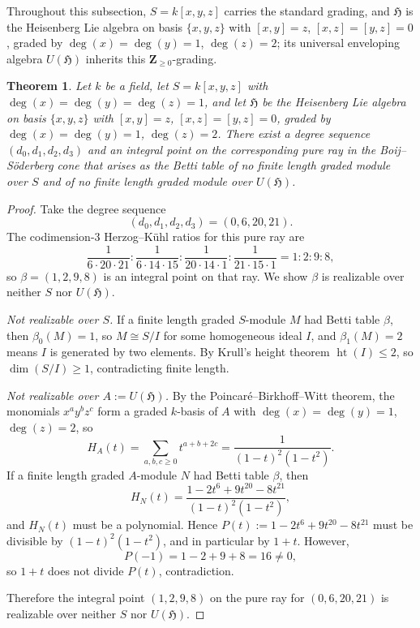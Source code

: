 \documentclass[11pt,reqno]{amsart}
\numberwithin{equation}{section}
\newtheorem{theorem}[thm]{Theorem}
\theoremstyle{definition}
\begin{document}
Throughout this subsection, $S=k[x,y,z]$ carries the standard grading,
and $\mathfrak H$ is the Heisenberg Lie algebra on basis $\{x,y,z\}$
with $[x,y]=z$, $[x,z]=[y,z]=0$, graded by $\deg(x)=\deg(y)=1$,
$\deg(z)=2$; its universal enveloping algebra $U(\mathfrak H)$
inherits this $\mathbf Z_{\ge 0}$-grading.

\begin{theorem}\label{thm:bs61}
Let $k$ be a field, let $S=k[x,y,z]$ with $\deg(x)=\deg(y)=\deg(z)=1$,
and let $\mathfrak H$ be the Heisenberg Lie algebra on basis $\{x,y,z\}$
with $[x,y]=z$, $[x,z]=[y,z]=0$, graded by $\deg(x)=\deg(y)=1$,
$\deg(z)=2$. There exist a degree sequence $(d_0,d_1,d_2,d_3)$ and an
integral point on the corresponding pure ray in the Boij--S\"oderberg
cone that arises as the Betti table of no finite length graded module
over $S$ and of no finite length graded module over $U(\mathfrak H)$.
\end{theorem}

\begin{proof}
Take the degree sequence
\[
   (d_0,d_1,d_2,d_3)=(0,6,20,21).
\]
The codimension-$3$ Herzog--K\"uhl ratios for this pure ray are
\[
   \frac{1}{6\cdot 20\cdot 21}:\frac{1}{6\cdot 14\cdot 15}
   :\frac{1}{20\cdot 14\cdot 1}:\frac{1}{21\cdot 15\cdot 1}
   =1:2:9:8,
\]
so $\beta=(1,2,9,8)$ is an integral point on that ray. We show $\beta$ is
realizable over neither $S$ nor $U(\mathfrak H)$.

\smallskip
\noindent\emph{Not realizable over $S$.} If a finite length graded
$S$-module $M$ had Betti table $\beta$, then $\beta_0(M)=1$, so
$M\cong S/I$ for some homogeneous ideal $I$, and $\beta_1(M)=2$ means
$I$ is generated by two elements. By Krull's height theorem
$\operatorname{ht}(I)\le 2$, so $\dim(S/I)\ge 1$, contradicting finite
length.

\smallskip
\noindent\emph{Not realizable over $A:=U(\mathfrak H)$.} By the
Poincar\'e--Birkhoff--Witt theorem, the monomials $x^a y^b z^c$ form a
graded $k$-basis of $A$ with $\deg(x)=\deg(y)=1$, $\deg(z)=2$, so
\[
   H_A(t)=\sum_{a,b,c\ge 0}t^{a+b+2c}=\frac{1}{(1-t)^2(1-t^2)}.
\]
If a finite length graded $A$-module $N$ had Betti table $\beta$, then
\[
   H_N(t)=\frac{1-2t^6+9t^{20}-8t^{21}}{(1-t)^2(1-t^2)},
\]
and $H_N(t)$ must be a polynomial. Hence
$P(t):=1-2t^6+9t^{20}-8t^{21}$ must be divisible by $(1-t)^2(1-t^2)$,
and in particular by $1+t$. However,
\[
   P(-1)=1-2+9+8=16\ne 0,
\]
so $1+t$ does not divide $P(t)$, contradiction.

Therefore the integral point $(1,2,9,8)$ on the pure ray for
$(0,6,20,21)$ is realizable over neither $S$ nor $U(\mathfrak H)$.
\end{proof}
\end{document}
